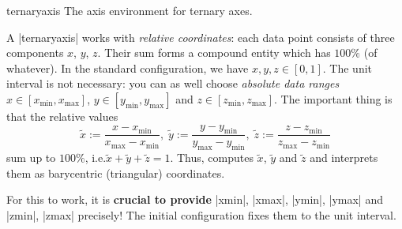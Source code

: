 \begin{environment}{{ternaryaxis}}
    The axis environment for ternary axes.
\begin{codeexample}[]
\end{codeexample}

    A |ternaryaxis| works with \emph{relative coordinates}: each data point
    consists of three components $x$, $y$, $z$. Their sum forms a compound
    entity which has $100\%$ (of whatever). In the standard configuration, we
    have $x,y,z \in [0,1]$. The unit interval is not necessary: you can as well
    choose \emph{absolute data ranges} $x \in [x_{\min},x_{\max}]$, $y \in
    [y_{\min},y_{\max}]$ and $z \in [z_{\min},z_{\max}]$. The important thing
    is that the relative values
        \[
            \tilde x := \frac{x-x_{\min}}{x_{\max} - x_{\min}},\;
            \tilde y := \frac{y-y_{\min}}{y_{\max} - y_{\min}},\;
            \tilde z := \frac{z-z_{\min}}{z_{\max} - z_{\min}}
        \]
    sum up to $100\%$, i.e.\@ $\tilde x + \tilde y + \tilde z = 1$. Thus,
    \PGFPlots{} computes $\tilde x$, $\tilde y$ and $\tilde z$ and interprets
    them as barycentric (triangular) coordinates.

    For this to work, it is \textbf{crucial to provide} |xmin|, |xmax|,
    |ymin|, |ymax| and |zmin|, |zmax| precisely! The initial configuration
    fixes them to the unit interval.


\end{environment}

